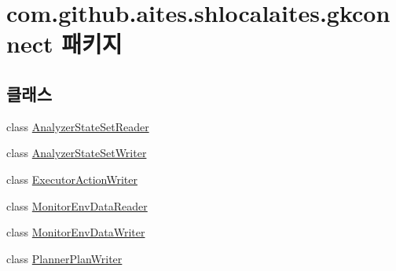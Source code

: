 \hypertarget{namespacecom_1_1github_1_1aites_1_1shlocalaites_1_1gkconnect}{}\section{com.\+github.\+aites.\+shlocalaites.\+gkconnect 패키지}
\label{namespacecom_1_1github_1_1aites_1_1shlocalaites_1_1gkconnect}
\subsection*{클래스}
\begin{DoxyCompactItemize}
\item 
class \mbox{\hyperlink{classcom_1_1github_1_1aites_1_1shlocalaites_1_1gkconnect_1_1_analyzer_state_set_reader}{Analyzer\+State\+Set\+Reader}}
\item 
class \mbox{\hyperlink{classcom_1_1github_1_1aites_1_1shlocalaites_1_1gkconnect_1_1_analyzer_state_set_writer}{Analyzer\+State\+Set\+Writer}}
\item 
class \mbox{\hyperlink{classcom_1_1github_1_1aites_1_1shlocalaites_1_1gkconnect_1_1_executor_action_writer}{Executor\+Action\+Writer}}
\item 
class \mbox{\hyperlink{classcom_1_1github_1_1aites_1_1shlocalaites_1_1gkconnect_1_1_monitor_env_data_reader}{Monitor\+Env\+Data\+Reader}}
\item 
class \mbox{\hyperlink{classcom_1_1github_1_1aites_1_1shlocalaites_1_1gkconnect_1_1_monitor_env_data_writer}{Monitor\+Env\+Data\+Writer}}
\item 
class \mbox{\hyperlink{classcom_1_1github_1_1aites_1_1shlocalaites_1_1gkconnect_1_1_planner_plan_writer}{Planner\+Plan\+Writer}}
\end{DoxyCompactItemize}
